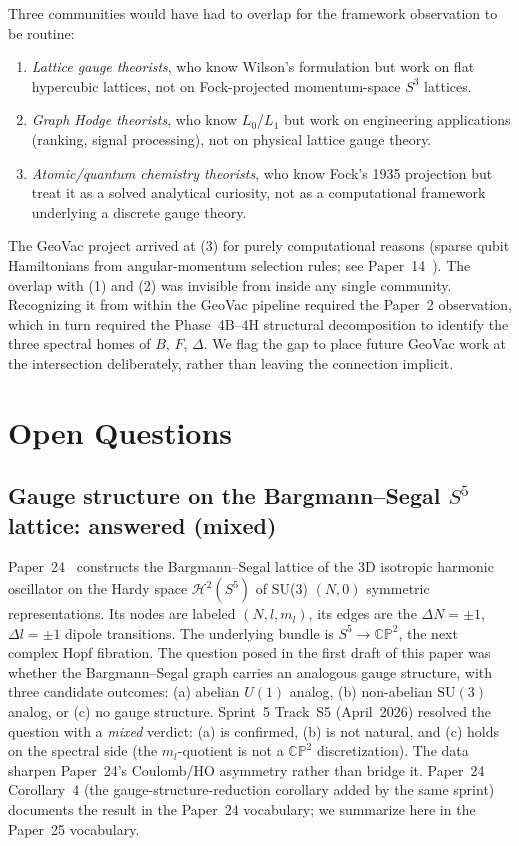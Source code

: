 \documentclass[aps,pra,twocolumn,superscriptaddress,longbibliography]{revtex4-2}
\begin{document}
Three communities would have had to overlap for the
framework observation to be routine:
\begin{enumerate}
\item \emph{Lattice gauge theorists}, who know Wilson's formulation
  but work on flat hypercubic lattices, not on Fock-projected
  momentum-space $S^3$ lattices.
\item \emph{Graph Hodge theorists}, who know $L_0$/$L_1$ but work
  on engineering applications (ranking, signal processing), not on
  physical lattice gauge theory.
\item \emph{Atomic/quantum chemistry theorists}, who know Fock's
  1935 projection but treat it as a solved analytical curiosity, not
  as a computational framework underlying a discrete gauge theory.
\end{enumerate}
The GeoVac project arrived at (3) for purely computational reasons
(sparse qubit Hamiltonians from angular-momentum selection rules;
see Paper~14~\cite{Paper14}).  The overlap with (1) and (2) was
invisible from inside any single community.  Recognizing it from
within the GeoVac pipeline required the Paper~2 observation, which in
turn required the Phase~4B--4H structural decomposition to
identify the three spectral homes of $B$, $F$, $\Delta$.  We flag
the gap to place future GeoVac work at the intersection
deliberately, rather than leaving the connection implicit.


\section{Open Questions}
\label{sec:open}

\subsection{Gauge structure on the Bargmann--Segal $S^5$ lattice: answered (mixed)}
\label{sec:s5_bargmann_open}

Paper~24~\cite{Paper24} constructs the Bargmann--Segal lattice
of the 3D isotropic harmonic oscillator on the Hardy space
$\mathcal{H}^2(S^5)$ of SU(3) $(N, 0)$ symmetric representations.
Its nodes are labeled $(N, l, m_l)$, its edges are the
$\Delta N = \pm 1$, $\Delta l = \pm 1$ dipole transitions.  The
underlying bundle is $S^5 \to \mathbb{CP}^2$, the next complex Hopf
fibration.  The question posed in the first draft of this paper was
whether the Bargmann--Segal graph carries an analogous gauge
structure, with three candidate outcomes: (a) abelian $U(1)$ analog,
(b) non-abelian $\mathrm{SU}(3)$ analog, or (c) no gauge structure.
Sprint~5 Track~S5 (April~2026) resolved the question with a
\emph{mixed} verdict: (a) is confirmed, (b) is not natural, and (c)
holds on the spectral side (the $m_l$-quotient is not a
$\mathbb{CP}^2$ discretization).  The data sharpen Paper~24's
Coulomb/HO asymmetry rather than bridge it.  Paper~24
Corollary~4 (the gauge-structure-reduction corollary added by the
same sprint) documents the result in the Paper~24 vocabulary; we
summarize here in the Paper~25 vocabulary.
\end{document}
